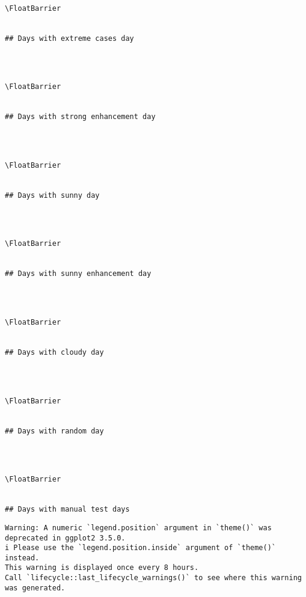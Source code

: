 \documentclass[
  10pt,
  a4paper,oneside]{article}
\begin{document}
\begin{verbatim}

\FloatBarrier


## Days with extreme cases day 
\end{verbatim}

\begin{verbatim}
 
 

\FloatBarrier


## Days with strong enhancement day 
\end{verbatim}

\begin{verbatim}
 
 

\FloatBarrier


## Days with sunny day 
\end{verbatim}

\begin{verbatim}
 
 

\FloatBarrier


## Days with sunny enhancement day 
\end{verbatim}

\begin{verbatim}
 
 

\FloatBarrier


## Days with cloudy day 
\end{verbatim}

\begin{verbatim}
 
 

\FloatBarrier


## Days with random day 
\end{verbatim}

\begin{verbatim}
 
 

\FloatBarrier


## Days with manual test days 
\end{verbatim}

\begin{verbatim}
Warning: A numeric `legend.position` argument in `theme()` was deprecated in ggplot2 3.5.0.
i Please use the `legend.position.inside` argument of `theme()` instead.
This warning is displayed once every 8 hours.
Call `lifecycle::last_lifecycle_warnings()` to see where this warning was generated.
\end{verbatim}
\end{document}
